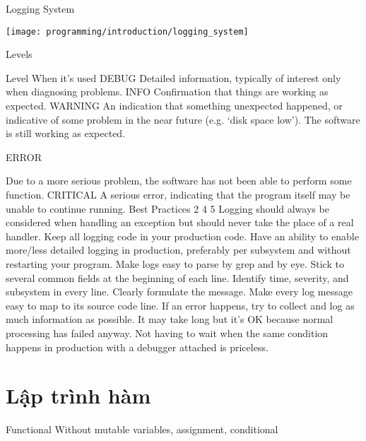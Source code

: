 Logging System

\texttt{[image: programming/introduction/logging\_system]}

Levels

Level	When it’s used
DEBUG	Detailed information, typically of interest only when diagnosing problems.
INFO	Confirmation that things are working as expected.
WARNING	An indication that something unexpected happened, or indicative of some problem in the near future (e.g. ‘disk space low’). The software is still working as expected.

ERROR

Due to a more serious problem, the software has not been able to perform some function.
CRITICAL	A serious error, indicating that the program itself may be unable to continue running.
Best Practices 2 4 5
Logging should always be considered when handling an exception but should never take the place of a real handler.
Keep all logging code in your production code. Have an ability to enable more/less detailed logging in production, preferably per subsystem and without restarting your program.
Make logs easy to parse by grep and by eye. Stick to several common fields at the beginning of each line. Identify time, severity, and subsystem in every line. Clearly formulate the message. Make every log message easy to map to its source code line.
If an error happens, try to collect and log as much information as possible. It may take long but it's OK because normal processing has failed anyway. Not having to wait when the same condition happens in production with a debugger attached is priceless.

\section{Lập trình hàm}

Functional
Without mutable variables, assignment, conditional

